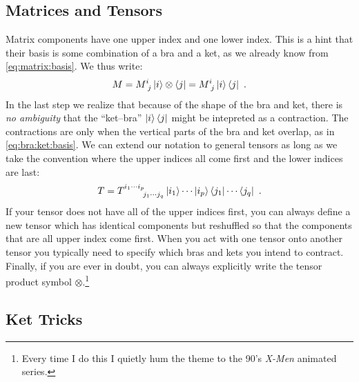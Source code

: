 \documentclass[12pt]{article}
\begin{document}
\subsection{Matrices and Tensors}

Matrix components have one upper index and one lower index. This is a hint that their basis is some combination of a bra and a ket, as we already know from \eqref{eq:matrix:basis}. We thus write:
\begin{align}
    M = M\aij{i}{j} \ket{i}\otimes\bra{j}  = M\aij{i}{j} \ket{i}\bra{j}  \ .
    \label{eq:matrix:in:ket}
\end{align}
In the last step we realize that because of the shape of the bra and ket, there is \emph{no ambiguity} that the ``ket--bra'' $\left|i\right\rangle\left\langle j\right|$ might be intepreted as a contraction. The contractions are only when the vertical parts of the bra and ket overlap, as in \eqref{eq:bra:ket:basis}. We can extend our notation to general tensors as long as we take the convention where the upper indices all come first and the lower indices are last:
\begin{align}
   T= T\aij{i_1\cdots i_p}{j_1\cdots j_q} \ket{i_1}\cdots\ket{i_p}\bra{j_1}\cdots\bra{j_q} \ .
\end{align}
If your tensor does not have all of the upper indices first, you can always define a new tensor which has identical components but reshuffled so that the components that are all upper index come first. When you act with one tensor onto another tensor you typically need to specify which bras and kets you intend to contract. Finally, if you are ever in doubt, you can always explicitly write the tensor product symbol $\otimes$.\footnote{Every time I do this I quietly hum the theme to the 90's \emph{X-Men} animated series.} 


\subsection{Ket Tricks}




\end{document}
